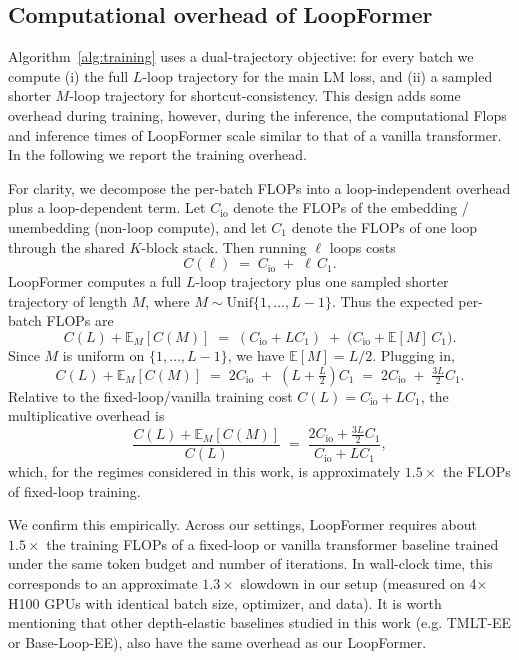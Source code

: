 \subsection{Computational overhead of LoopFormer}
\label{sec:supp_overhead}

Algorithm~\ref{alg:training} uses a dual-trajectory objective: for every batch we compute (i) the full $L$-loop trajectory for the main LM loss, and (ii) a sampled shorter $M$-loop trajectory for shortcut-consistency. This design adds some overhead during training, however, during the inference, the computational Flops and inference times of LoopFormer scale similar to that of a vanilla transformer. In the following we report the training overhead.



For clarity, we decompose the per-batch FLOPs into a loop-independent overhead plus a loop-dependent term. Let $C_{\text{io}}$ denote the FLOPs of the embedding / unembedding (non-loop compute), and let $C_{1}$ denote the FLOPs of one loop through the shared $K$-block stack. Then running $\ell$ loops costs
\[
C(\ell) \;=\; C_{\text{io}} \;+\; \ell\,C_{1}.
\]
LoopFormer computes a full $L$-loop trajectory plus one sampled shorter trajectory of length $M$, where $M \sim \text{Unif}\{1,\dots,L-1\}$. Thus the expected per-batch FLOPs are
\[
C(L) + \mathbb{E}_{M}[C(M)]
\;=\; (C_{\text{io}} + L C_{1}) \;+\; \bigl(C_{\text{io}} + \mathbb{E}[M]\,C_{1}\bigr).
\]
Since $M$ is uniform on $\{1,\dots,L-1\}$, we have $\mathbb{E}[M]=L/2$. Plugging in,
\[
C(L) + \mathbb{E}_{M}[C(M)]
\;=\; 2C_{\text{io}} \;+\; \left(L+\tfrac{L}{2}\right)C_{1}
\;=\; 2C_{\text{io}} \;+\; \tfrac{3L}{2}C_{1}.
\]
Relative to the fixed-loop/vanilla training cost $C(L)=C_{\text{io}}+LC_{1}$, the multiplicative overhead is
\[
\frac{C(L) + \mathbb{E}_{M}[C(M)]}{C(L)}
\;=\;
\frac{2C_{\text{io}} + \tfrac{3L}{2}C_{1}}{C_{\text{io}} + L C_{1}},
\]
which, for the regimes considered in this work, is approximately $1.5\times$ the FLOPs of fixed-loop training.


We confirm this empirically. Across our settings, LoopFormer requires about $1.5\times$ the training FLOPs of a fixed-loop or vanilla transformer baseline trained under the same token budget and number of iterations. In wall-clock time, this corresponds to an approximate $1.3\times$ slowdown in our setup (measured on 4$\times$H100 GPUs with identical batch size, optimizer, and data). It is worth mentioning that other depth-elastic baselines studied in this work (e.g. TMLT-EE or Base-Loop-EE), also have the same overhead as our LoopFormer.

